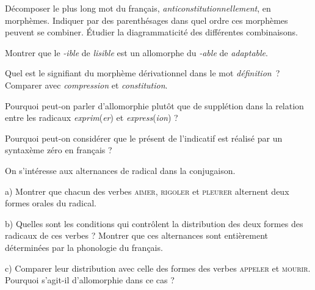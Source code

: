 {     Décomposer le plus long mot du français, \textit{anticonstitutionnellement}, en morphèmes. Indiquer par des parenthésages dans quel ordre ces morphèmes peuvent se combiner. Étudier la diagrammaticité des différentes combinaisons.

     Montrer que le \textit{{}-ible} de \textit{lisible} est un allomorphe du \textit{{}-able} de \textit{adaptable}.

     Quel est le signifiant du morphème dérivationnel dans le mot \textit{définition~}? Comparer avec \textit{compression} et \textit{constitution}.

     Pourquoi peut-on parler d’allomorphie plutôt que de supplétion dans la relation entre les radicaux \textit{exprim}(\textit{er}) et \textit{express}(\textit{ion}) ?

     Pourquoi peut-on considérer que le présent de l’indicatif est réalisé par un syntaxème zéro en français ?

     On s’intéresse aux alternances de radical dans la conjugaison.

    a) Montrer que chacun des verbes \textsc{aimer}, \textsc{rigoler} et \textsc{pleurer} alternent deux formes orales du radical.

    b) Quelles sont les conditions qui contrôlent la distribution des deux formes des radicaux de ces verbes ? Montrer que ces alternances sont entièrement déterminées par la phonologie du français.

    c) Comparer leur distribution avec celle des formes des verbes \textsc{appeler} et \textsc{mourir}. Pourquoi s’agit-il d’allomorphie dans ce cas ?
}
